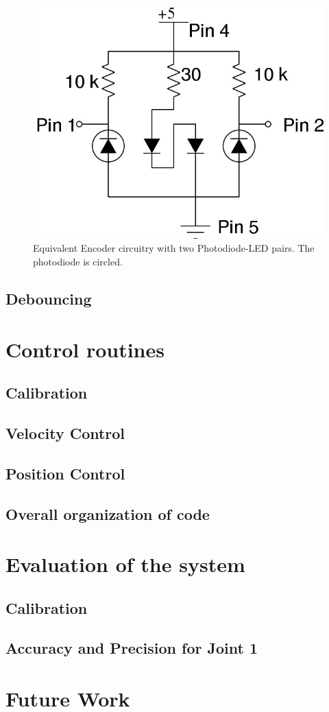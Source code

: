 \documentclass[10pt,a4paper]{article}
\begin{document}
\begin{figure}[h]
    \centering
    \includegraphics[scale=0.5]{EncoderCircuit.jpg}
    \caption{Equivalent Encoder circuitry with two Photodiode-LED
      pairs. The photodiode is circled.}
    \label{fig:encoderCircuit}
\end{figure}

\subsection{Debouncing}

\section{Control routines}

\subsection{Calibration}
\subsection{Velocity Control}
\subsection{Position Control}
\subsection{Overall organization of code}

\section{Evaluation of the system}

\subsection{Calibration}
\subsection{Accuracy and Precision for Joint 1}

\section{Future Work}
\end{document}
